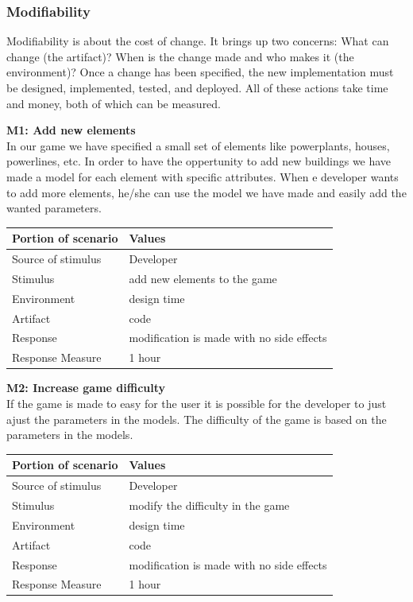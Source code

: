\subsubsection{Modifiability}

Modifiability is about the cost of change. It brings up two concerns: What can change (the artifact)? 
When is the change made and who makes it (the environment)? 
Once a change has been specified, the new implementation must be designed, 
implemented, tested, and deployed. All of these actions take time and money, both of which can be measured.


{\bf M1: Add new elements} \\
In our game we have specified a small set of elements like powerplants, houses, powerlines, etc.
In order to have the oppertunity to add new buildings we have made a model for each element
with specific attributes. When e developer wants to add more elements, he/she can use the model
we have made and easily add the wanted parameters. 

\begin{tabular}{| l | l |}
	\hline
	{\bf Portion of scenario} & {\bf Values} \\ \hline
	Source of stimulus & Developer\\ \hline
	Stimulus & add new elements to the game\\ \hline
	Environment & design time \\ \hline
	Artifact &  code \\ \hline
	Response & modification is made with no side effects\\ \hline
	Response Measure & 1 hour\\ \hline
\end{tabular}

{\bf M2: Increase game difficulty} \\
If the game is made to easy for the user it is possible for the developer to just ajust the
parameters in the models. The difficulty of the game is based on the parameters
in the models. 

\begin{tabular}{| l | l |}
	\hline
	{\bf Portion of scenario} & {\bf Values} \\ \hline
	Source of stimulus & Developer\\ \hline
	Stimulus & modify the difficulty in the game\\ \hline
	Environment & design time \\ \hline
	Artifact & code \\ \hline
	Response & modification is made with no side effects\\ \hline
	Response Measure & 1 hour\\ \hline
\end{tabular}

